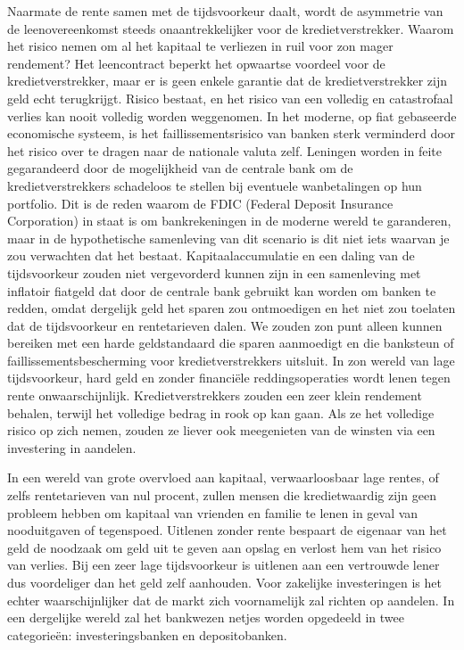 Naarmate de rente samen met de tijdsvoorkeur daalt, wordt de asymmetrie van de leenovereenkomst steeds onaantrekkelijker voor de kredietverstrekker. Waarom het risico nemen om al het kapitaal te verliezen in ruil voor zo\textquotesingle n mager rendement? Het leencontract beperkt het opwaartse voordeel voor de kredietverstrekker, maar er is geen enkele garantie dat de kredietverstrekker zijn geld echt terugkrijgt. Risico bestaat, en het risico van een volledig en catastrofaal verlies kan nooit volledig worden weggenomen. In het moderne, op fiat gebaseerde economische systeem, is het faillissementsrisico van banken sterk verminderd door het risico over te dragen naar de nationale valuta zelf. Leningen worden in feite gegarandeerd door de mogelijkheid van de centrale bank om de kredietverstrekkers schadeloos te stellen bij eventuele wanbetalingen op hun portfolio. Dit is de reden waarom de FDIC (Federal Deposit Insurance Corporation) in staat is om bankrekeningen in de moderne wereld te garanderen, maar in de hypothetische samenleving van dit scenario is dit niet iets waarvan je zou verwachten dat het bestaat. Kapitaalaccumulatie en een daling van de tijdsvoorkeur zouden niet vergevorderd kunnen zijn in een samenleving met inflatoir fiatgeld dat door de centrale bank gebruikt kan worden om banken te redden, omdat dergelijk geld het sparen zou ontmoedigen en het niet zou toelaten dat de tijdsvoorkeur en rentetarieven dalen. We zouden zo\textquotesingle n punt alleen kunnen bereiken met een harde geldstandaard die sparen aanmoedigt en die banksteun of faillissementsbescherming voor kredietverstrekkers uitsluit. In zo\textquotesingle n wereld van lage tijdsvoorkeur, hard geld en zonder financiële reddingsoperaties wordt lenen tegen rente onwaarschijnlijk. Kredietverstrekkers zouden een zeer klein rendement behalen, terwijl het volledige bedrag in rook op kan gaan. Als ze het volledige risico op zich nemen, zouden ze liever ook meegenieten van de winsten via een investering in aandelen.

In een wereld van grote overvloed aan kapitaal, verwaarloosbaar lage rentes, of zelfs rentetarieven van nul procent, zullen mensen die kredietwaardig zijn geen probleem hebben om kapitaal van vrienden en familie te lenen in geval van nooduitgaven of tegenspoed. Uitlenen zonder rente bespaart de eigenaar van het geld de noodzaak om geld uit te geven aan opslag en verlost hem van het risico van verlies. Bij een zeer lage tijdsvoorkeur is uitlenen aan een vertrouwde lener dus voordeliger dan het geld zelf aanhouden. Voor zakelijke investeringen is het echter waarschijnlijker dat de markt zich voornamelijk zal richten op aandelen. In een dergelijke wereld zal het bankwezen netjes worden opgedeeld in twee categorieën: investeringsbanken en depositobanken.

